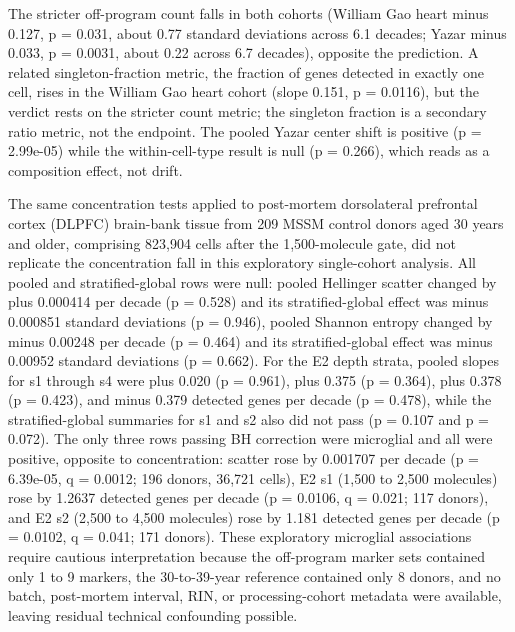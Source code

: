 \documentclass[11pt]{article}
\begin{document}
The stricter off-program count falls in both cohorts (William Gao heart minus 0.127, p = 0.031, about 0.77 standard deviations across 6.1 decades; Yazar minus 0.033, p = 0.0031, about 0.22 across 6.7 decades), opposite the prediction. A related singleton-fraction metric, the fraction of genes detected in exactly one cell, rises in the William Gao heart cohort (slope 0.151, p = 0.0116), but the verdict rests on the stricter count metric; the singleton fraction is a secondary ratio metric, not the endpoint. The pooled Yazar center shift is positive (p = 2.99e-05) while the within-cell-type result is null (p = 0.266), which reads as a composition effect, not drift.

The same concentration tests applied to post-mortem dorsolateral prefrontal cortex (DLPFC) brain-bank tissue from 209 MSSM control donors aged 30 years and older, comprising 823,904 cells after the 1,500-molecule gate, did not replicate the concentration fall in this exploratory single-cohort analysis. All pooled and stratified-global rows were null: pooled Hellinger scatter changed by plus 0.000414 per decade (p = 0.528) and its stratified-global effect was minus 0.000851 standard deviations (p = 0.946), pooled Shannon entropy changed by minus 0.00248 per decade (p = 0.464) and its stratified-global effect was minus 0.00952 standard deviations (p = 0.662). For the E2 depth strata, pooled slopes for s1 through s4 were plus 0.020 (p = 0.961), plus 0.375 (p = 0.364), plus 0.378 (p = 0.423), and minus 0.379 detected genes per decade (p = 0.478), while the stratified-global summaries for s1 and s2 also did not pass (p = 0.107 and p = 0.072). The only three rows passing BH correction were microglial and all were positive, opposite to concentration: scatter rose by 0.001707 per decade (p = 6.39e-05, q = 0.0012; 196 donors, 36,721 cells), E2 s1 (1,500 to 2,500 molecules) rose by 1.2637 detected genes per decade (p = 0.0106, q = 0.021; 117 donors), and E2 s2 (2,500 to 4,500 molecules) rose by 1.181 detected genes per decade (p = 0.0102, q = 0.041; 171 donors). These exploratory microglial associations require cautious interpretation because the off-program marker sets contained only 1 to 9 markers, the 30-to-39-year reference contained only 8 donors, and no batch, post-mortem interval, RIN, or processing-cohort metadata were available, leaving residual technical confounding possible.
\end{document}
